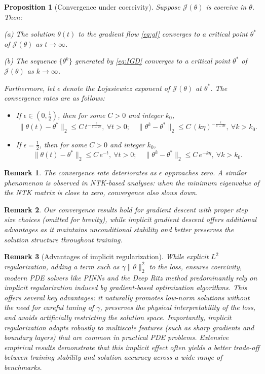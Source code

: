 \documentclass{article}
\newtheorem{remark}{Remark}
\newtheorem{proposition}{Proposition}
\begin{document}
\fi
\begin{proposition}[Convergence under coercivity]\label{proposition:convergence under coer}
    Suppose $\mathcal{J}(\theta)$ is coercive in $\theta$. Then:
   
        (a) The solution $\theta(t)$ to the gradient flow \cref{eq:gf} converges to a critical point $\theta^*$ of $\mathcal{J}(\theta)$ as $t\to\infty$.
        
        (b) The sequence $\{\theta^k\}$ generated by \cref{eq:IGD} converges to a critical point $\theta^*$ of $\mathcal{J}(\theta)$ as $k\to\infty$.
    
    Furthermore, let $\epsilon$ denote the \L{}ojasiewicz exponent of $\mathcal{J}(\theta)$ at $\theta^*$. The convergence rates are as follows:
    \begin{itemize}
        \item[(i)] If $\epsilon\in(0,\frac{1}{2})$, then for some $C>0$ and integer $k_0$,
        \[
        \|\theta(t)-\theta^*\|_{2} \leq C\, t^{-\frac{\epsilon}{1-2\epsilon}},\ \forall t>0;\quad
        \|\theta^k-\theta^*\|_{2} \leq C\, (k\eta)^{-\frac{\epsilon}{1-2\epsilon}},\ \forall k>k_0.
        \]
        \item[(ii)] If $\epsilon = \frac{1}{2}$, then for some $C>0$ and integer $k_0$,
        \[
        \|\theta(t)-\theta^*\|_{2} \leq C\, e^{-t},\ \forall t>0;\quad
        \|\theta^k-\theta^*\|_{2} \leq C\, e^{-k\eta},\ \forall k>k_0.
        \]
    \end{itemize}
\end{proposition}

\begin{remark}
    The convergence rate deteriorates as \(\epsilon\) approaches zero. A similar phenomenon is observed in NTK-based analyses: when the minimum eigenvalue of the NTK matrix is close to zero, convergence also slows down. 
\end{remark}
\begin{remark}
Our convergence results hold for gradient descent with proper step size choices (omitted for brevity), while implicit gradient descent offers additional advantages as it maintains unconditional stability and better preserves the solution structure throughout training.
\end{remark}
\begin{remark}[Advantages of implicit regularization]
While explicit $L^2$ regularization, adding a term such as $\gamma \|\theta\|_2^2$ to the loss, ensures coercivity, modern PDE solvers like PINNs and the Deep Ritz method predominantly rely on implicit regularization induced by gradient-based optimization algorithms. 
This offers several key advantages: it naturally promotes low-norm solutions without the need for careful tuning of $\gamma$, preserves the physical interpretability of the loss, and avoids artificially restricting the solution space. 
Importantly, implicit regularization adapts robustly to multiscale features (such as sharp gradients and boundary layers) that are common in practical PDE problems. 
Extensive empirical results demonstrate that this implicit effect often yields a better trade-off between training stability and solution accuracy across a wide range of benchmarks.
\end{remark}
\end{document}
